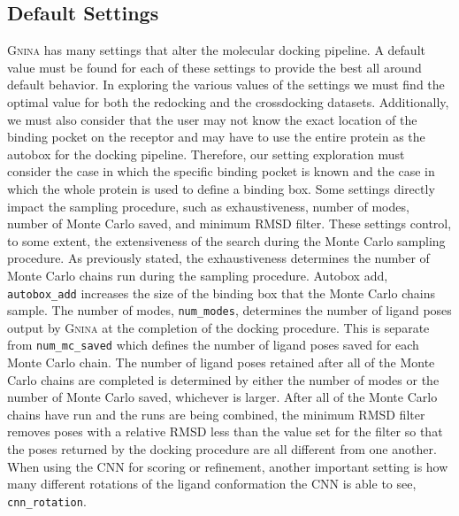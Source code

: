 \documentclass[journal=jcisd8,manuscript=article]{achemso}
\begin{document}
\subsection{Default Settings}
\textsc{Gnina} has many settings that alter the molecular docking pipeline. A default value must be found for each of these settings to provide the best all around default behavior. In exploring the various values of the settings we must find the optimal value for both the redocking and the crossdocking datasets. Additionally, we must also consider that the user may not know the exact location of the binding pocket on the receptor and may have to use the entire protein as the autobox for the docking pipeline. Therefore, our setting exploration must consider the case in which the specific binding pocket is known and the case in which the whole protein is used to define a binding box. Some settings directly impact the sampling procedure, such as exhaustiveness, number of modes, number of Monte Carlo saved, and minimum RMSD filter. These settings control, to some extent, the extensiveness of the search during the Monte Carlo sampling procedure. As previously stated, the exhaustiveness determines the number of Monte Carlo chains run during the sampling procedure. Autobox add, \texttt{autobox\_add} increases the size of the binding box that the Monte Carlo chains sample. The number of modes, \texttt{num\_modes}, determines the number of ligand poses output by \textsc{Gnina} at the completion of the docking procedure. This is separate from \texttt{num\_mc\_saved} which defines the number of ligand poses saved for each Monte Carlo chain. The number of ligand poses retained after all of the Monte Carlo chains are completed is determined by either the number of modes or the number of Monte Carlo saved, whichever is larger. After all of the Monte Carlo chains have run and the runs are being combined, the minimum RMSD filter removes poses with a relative RMSD less than the value set for the filter so that the poses returned by the docking procedure are all different from one another. When using the CNN for scoring or refinement, another important setting is how many different rotations of the ligand conformation the CNN is able to see, \texttt{cnn\_rotation}.
\end{document}
